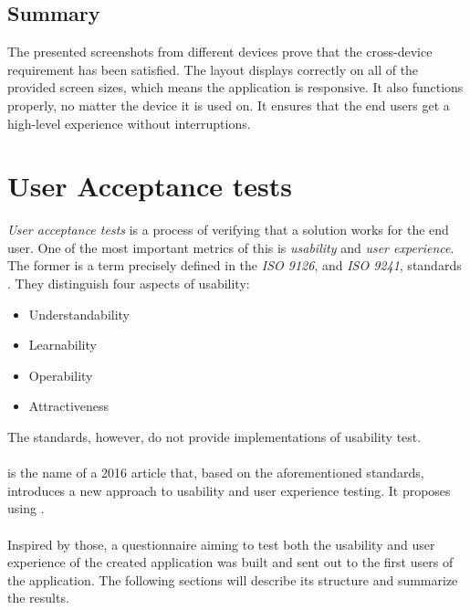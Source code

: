 \subsection{Summary}
The presented screenshots from different devices prove that the cross-device requirement has been satisfied. The layout displays correctly on all of the provided screen sizes, which means the application is responsive. It also functions properly, no matter the device it is used on. It ensures that the end users get a high-level experience without interruptions.






\section{User Acceptance tests}\label{sec:tests:user}
\textit{User acceptance tests} is a process of verifying that a solution works for the end user. One of the most important metrics of this is \textit{usability} and \textit{user experience}. The former is a term precisely defined in the \textit{ISO 9126},  and \textit{ISO 9241},  standards \cite{idriUseSoftwareQuality2013,moumaneUsabilityEvaluationMobile2016}. They distinguish four aspects of usability:
\begin{itemize}
    \item Understandability
    \item Learnability
    \item Operability
    \item Attractiveness
\end{itemize}
The standards, however, do not provide implementations of usability test.
\\\\
 is the name of a 2016 article that, based on the aforementioned standards, introduces a new approach to usability and user experience testing. It proposes using  \cite{nascimentoUserbilityTechniqueEvaluation2016}.
\\\\
Inspired by those, a questionnaire aiming to test both the usability and user experience of the created application was built and sent out to the first users of the application. The following sections will describe its structure and summarize the results.

